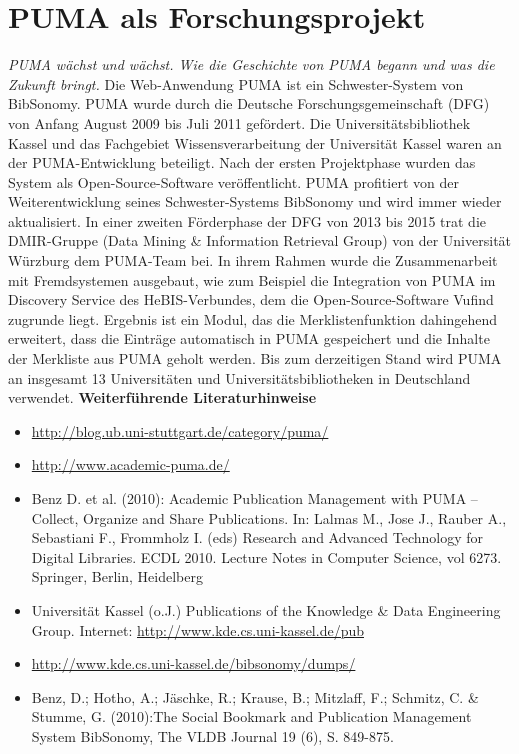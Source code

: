 \chapter{PUMA als Forschungsprojekt}
\label{ch:pumaForschungsprojekt}
\textit{PUMA wächst und wächst. Wie die Geschichte von PUMA begann und was die Zukunft bringt.}
\newline
\newline
Die Web-Anwendung PUMA ist ein Schwester-System von BibSonomy.  PUMA wurde durch die Deutsche Forschungsgemeinschaft (DFG) von Anfang August 2009 bis Juli 2011 gefördert. Die Universitätsbibliothek Kassel und das Fachgebiet Wissensverarbeitung der Universität Kassel waren an der PUMA-Entwicklung beteiligt. Nach der ersten Projektphase wurden das System als Open-Source-Software veröffentlicht. PUMA profitiert von der Weiterentwicklung seines Schwester-Systems BibSonomy und wird immer wieder aktualisiert. In einer zweiten Förderphase der DFG von 2013 bis 2015 trat die DMIR-Gruppe (Data Mining \& Information Retrieval Group) von der Universität Würzburg dem PUMA-Team bei. In ihrem Rahmen wurde die Zusammenarbeit mit Fremdsystemen ausgebaut, wie zum Beispiel die Integration von PUMA im Discovery Service des HeBIS-Verbundes, dem die Open-Source-Software Vufind zugrunde liegt. Ergebnis ist ein Modul, das die Merklistenfunktion dahingehend erweitert, dass die Einträge automatisch in PUMA gespeichert und die Inhalte der Merkliste aus PUMA geholt werden. Bis zum derzeitigen Stand wird PUMA an insgesamt 13 Universitäten und Universitätsbibliotheken in Deutschland verwendet. 
\newline\newline
\textbf{Weiterführende Literaturhinweise}\newline
\begin{itemize}
\item \url{http://blog.ub.uni-stuttgart.de/category/puma/}
\item \url{http://www.academic-puma.de/}
\item Benz D. et al. (2010): Academic Publication Management with PUMA – Collect, Organize and Share Publications. In: Lalmas M., Jose J., Rauber A., Sebastiani F., Frommholz I. (eds) Research and Advanced Technology for Digital Libraries. ECDL 2010. Lecture Notes in Computer Science, vol 6273. Springer, Berlin, Heidelberg
\item Universität Kassel (o.J.) Publications of the Knowledge \& Data Engineering Group. Internet: \url{http://www.kde.cs.uni-kassel.de/pub}
\item \url{http://www.kde.cs.uni-kassel.de/bibsonomy/dumps/}
\item Benz, D.; Hotho, A.; Jäschke, R.; Krause, B.; Mitzlaff, F.; Schmitz, C. \& Stumme, G. (2010):The Social Bookmark and Publication Management System BibSonomy, The VLDB Journal 19 (6), S. 849-875. 
\end{itemize}
